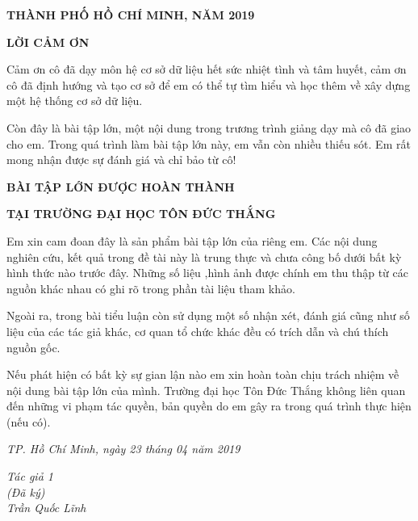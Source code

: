\documentclass{report}
\begin{document}
\vspace{1cm}
\changefontsizes{14pt}
\centerline{\textbf{THÀNH PHỐ HỒ CHÍ MINH, NĂM 2019}}


\newpage
\changefontsizes{16pt}
\centerline{\textbf{LỜI CẢM ƠN}}

\changefontsizes{13pt}
\bigskip
\setlength{\parindent}{2cm}

Cảm ơn cô đã dạy môn hệ cơ sở dữ liệu hết sức nhiệt tình và tâm huyết, cảm ơn cô đã định hướng và tạo cơ sở để em có thể tự tìm hiểu và học thêm về xây dựng một hệ thống cơ sở dữ liệu.

Còn đây là bài tập lớn, một nội dung trong trương trình giảng dạy mà cô đã giao cho em. Trong quá trình làm bài tập lớn này, em vẫn còn nhiều thiếu sót. Em rất mong nhận được sự đánh giá và chỉ bảo từ cô!
    
\newpage
\changefontsizes{16pt}
\centerline{\textbf{BÀI TẬP LỚN ĐƯỢC HOÀN THÀNH}}
\centerline{\textbf{TẠI TRƯỜNG ĐẠI HỌC TÔN ĐỨC THẮNG}}
\changefontsizes{13pt}
\vspace{1cm}
\setlength{\parindent}{2cm}
Em xin cam đoan đây là sản phẩm bài tập lớn của riêng em. Các nội dung nghiên cứu, kết quả trong đề tài này là trung thực và chưa công bố dưới bất kỳ hình thức nào trước đây. Những số liệu ,hình ảnh được chính em thu thập từ các nguồn khác nhau có ghi rõ trong phần tài liệu tham khảo.

\setlength{\parindent}{2cm}
Ngoài ra, trong bài tiểu luận còn sử dụng một số nhận xét, đánh giá cũng như số liệu của các tác giả khác, cơ quan tổ chức khác đều có trích dẫn và chú thích nguồn gốc.

\setlength{\parindent}{2cm}
Nếu phát hiện có bất kỳ sự gian lận nào em xin hoàn toàn chịu trách nhiệm về nội dung bài tập lớn của mình. Trường đại học Tôn Đức Thắng không liên quan đến những vi phạm tác quyền, bản quyền do em gây ra trong quá trình thực hiện (nếu có).

\vspace{0.75cm}
\begin{flushright}
\renewcommand{\baselinestretch}{0.05}
\changefontsizes{13pt}
\textit{TP. Hồ Chí Minh, ngày 23 tháng 04 năm 2019}
\end{flushright}

\setlength{\parindent}{12cm}
\textit{Tác giả 1}\\

\setlength{\parindent}{12cm}
\textit{(Đã ký)}\\

\setlength{\parindent}{11.25cm}
\textit{Trần Quốc Lĩnh}\\
\end{document}
